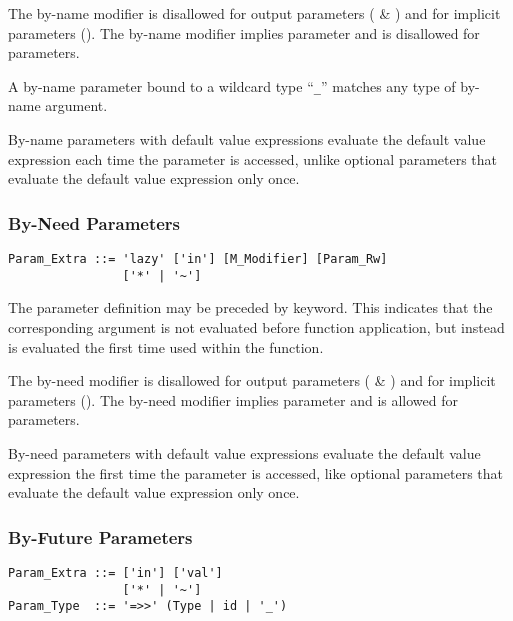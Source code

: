 The by-name modifier is disallowed for output parameters ( \& ) and for implicit parameters (). The by-name modifier implies  parameter and is disallowed for  parameters. 

A by-name parameter bound to a wildcard type ``\lstinline!_!'' matches any type of by-name argument. 

By-name parameters with default value expressions evaluate the default value expression each time the parameter is accessed, unlike optional parameters that evaluate the default value expression only once. 






\subsubsection{By-Need Parameters}
\label{sec:by-need-parameters}

\syntax\begin{lstlisting}
Param_Extra ::= 'lazy' ['in'] [M_Modifier] [Param_Rw]
                ['*' | '~']
\end{lstlisting}

The parameter definition may be preceded by  keyword. This indicates that the corresponding argument is not evaluated before function application, but instead is evaluated the first time used within the function. 

The by-need modifier is disallowed for output parameters ( \& ) and for implicit parameters (). The by-need modifier implies  parameter and is allowed for  parameters. 

By-need parameters with default value expressions evaluate the default value expression the first time the parameter is accessed, like optional parameters that evaluate the default value expression only once. 






\subsubsection{By-Future Parameters}
\label{sec:by-future-parameters}

\syntax\begin{lstlisting}
Param_Extra ::= ['in'] ['val']
                ['*' | '~']
Param_Type  ::= '=>>' (Type | id | '_')
\end{lstlisting}

